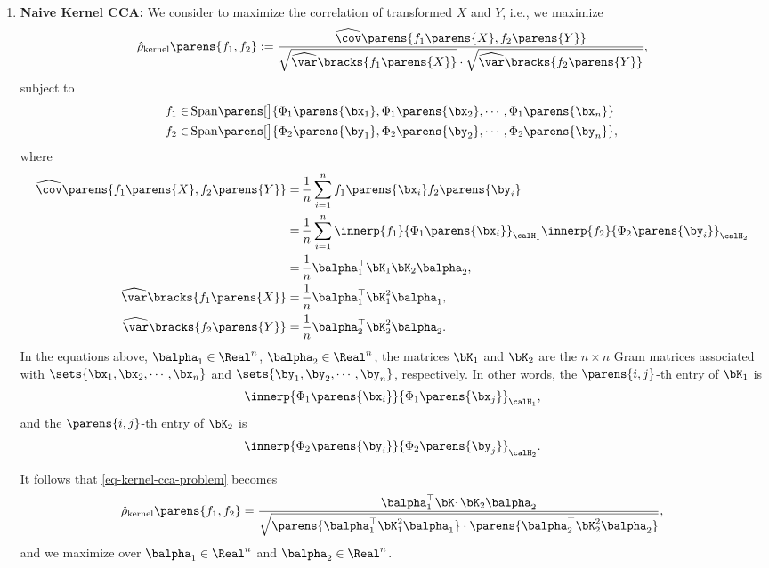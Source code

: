 \documentclass[12pt]{article}
\begin{document}
\begin{enumerate}[label=\textbf{\arabic*.}]
	\item \textbf{Naive Kernel CCA:} We consider to maximize the correlation of transformed $X$ and $Y$, i.e., we maximize 
	\begin{align}\label{eq-kernel-cca-problem}
		\hat{\rho}_{\mathrm{kernel}} \parens{f_1, f_2} := \frac{\widehat{\cov} \parens{f_1 \parens{X}, f_2 \parens{Y}}}{\sqrt{\widehat{\var} \bracks{f_1 \parens{X}}} \cdot \sqrt{\widehat{\var} \bracks{f_2 \parens{Y}}}}, 
	\end{align}
	subject to 
	\begin{align*}
		f_1 \in & \, \mathrm{Span} \parens[\big]{\Phi_1 \parens{\bx_1}, \Phi_1 \parens{\bx_2}, \cdots, \Phi_1 \parens{\bx_n}}  \\ 
		f_2 \in & \, \mathrm{Span} \parens[\big]{\Phi_2 \parens{\by_1}, \Phi_2 \parens{\by_2}, \cdots, \Phi_2 \parens{\by_n}}, 
	\end{align*}
	where 
	\begin{align}
		\widehat{\cov} \parens{f_1 \parens{X}, f_2 \parens{Y}} = & \, \frac{1}{n} \sum_{i=1}^n f_1 \parens{\bx_i} f_2 \parens{\by_i} \nonumber \\ 
		= & \, \frac{1}{n} \sum_{i=1}^n \innerp{f_1}{\Phi_1 \parens{\bx_i}}_{\calH_1} \innerp{f_2}{\Phi_2 \parens{\by_i}}_{\calH_2} \nonumber \\ 
		= & \, \frac{1}{n} \balpha_1^\top \bK_1 \bK_2 \balpha_2, \\
		\widehat{\var} \bracks{f_1 \parens{X}} = & \, \frac{1}{n} \balpha_1^\top \bK_1^2 \balpha_1, \\ 
		\widehat{\var} \bracks{f_2 \parens{Y}} = & \, \frac{1}{n} \balpha_2^\top \bK_2^2 \balpha_2. 
	\end{align}
	In the equations above, $\balpha_1 \in \Real^n$, $\balpha_2 \in \Real^n$, the matrices $\bK_1$ and $\bK_2$ are the $n \times n$ Gram matrices associated with $\sets{\bx_1, \bx_2, \cdots, \bx_n}$ and $\sets{\by_1, \by_2, \cdots, \by_n}$, respectively. In other words, the $\parens{i, j}$-th entry of $\bK_1$ is 
	\begin{align*}
		\innerp{\Phi_1 \parens{\bx_i}}{\Phi_1 \parens{\bx_j}}_{\calH_1}, 
	\end{align*}
	and 
	the $\parens{i, j}$-th entry of $\bK_2$ is 
	\begin{align*}
		\innerp{\Phi_2 \parens{\by_i}}{\Phi_2 \parens{\by_j}}_{\calH_2}. 
	\end{align*}
	
	It follows that \eqref{eq-kernel-cca-problem} becomes 
	\begin{align}\label{eq-kernel-cca-problem2}
		\hat{\rho}_{\mathrm{kernel}} \parens{f_1, f_2} = \frac{\balpha_1^\top \bK_1 \bK_2 \balpha_2}{\sqrt{\parens{\balpha_1^\top \bK_1^2 \balpha_1} \cdot \parens{\balpha_2^\top \bK_2^2 \balpha_2}}}, 
	\end{align}
	and we maximize over $\balpha_1 \in \Real^n$ and $\balpha_2 \in \Real^n$. 
	

\end{enumerate}
\end{document}
